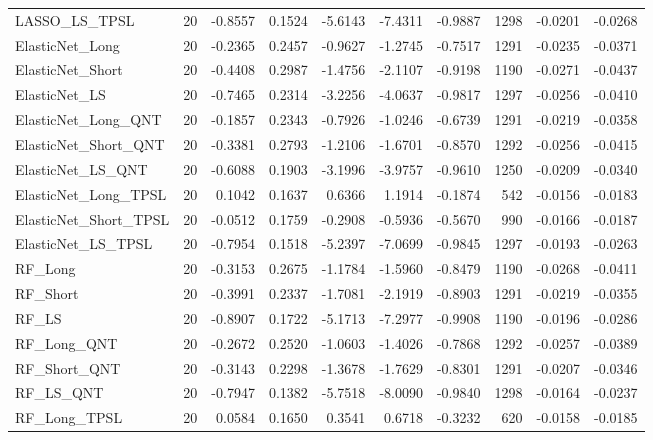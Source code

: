 \begin{tabular}{llrrrrrrrr}
\cline{1-10}
LASSO\_LS\_TPSL & 20 & -0.8557 & 0.1524 & -5.6143 & -7.4311 & -0.9887 & 1298 & -0.0201 & -0.0268 \\
\cline{1-10}
ElasticNet\_Long & 20 & -0.2365 & 0.2457 & -0.9627 & -1.2745 & -0.7517 & 1291 & -0.0235 & -0.0371 \\
\cline{1-10}
ElasticNet\_Short & 20 & -0.4408 & 0.2987 & -1.4756 & -2.1107 & -0.9198 & 1190 & -0.0271 & -0.0437 \\
\cline{1-10}
ElasticNet\_LS & 20 & -0.7465 & 0.2314 & -3.2256 & -4.0637 & -0.9817 & 1297 & -0.0256 & -0.0410 \\
\cline{1-10}
ElasticNet\_Long\_QNT & 20 & -0.1857 & 0.2343 & -0.7926 & -1.0246 & -0.6739 & 1291 & -0.0219 & -0.0358 \\
\cline{1-10}
ElasticNet\_Short\_QNT & 20 & -0.3381 & 0.2793 & -1.2106 & -1.6701 & -0.8570 & 1292 & -0.0256 & -0.0415 \\
\cline{1-10}
ElasticNet\_LS\_QNT & 20 & -0.6088 & 0.1903 & -3.1996 & -3.9757 & -0.9610 & 1250 & -0.0209 & -0.0340 \\
\cline{1-10}
ElasticNet\_Long\_TPSL & 20 & 0.1042 & 0.1637 & 0.6366 & 1.1914 & -0.1874 & 542 & -0.0156 & -0.0183 \\
\cline{1-10}
ElasticNet\_Short\_TPSL & 20 & -0.0512 & 0.1759 & -0.2908 & -0.5936 & -0.5670 & 990 & -0.0166 & -0.0187 \\
\cline{1-10}
ElasticNet\_LS\_TPSL & 20 & -0.7954 & 0.1518 & -5.2397 & -7.0699 & -0.9845 & 1297 & -0.0193 & -0.0263 \\
\cline{1-10}
RF\_Long & 20 & -0.3153 & 0.2675 & -1.1784 & -1.5960 & -0.8479 & 1190 & -0.0268 & -0.0411 \\
\cline{1-10}
RF\_Short & 20 & -0.3991 & 0.2337 & -1.7081 & -2.1919 & -0.8903 & 1291 & -0.0219 & -0.0355 \\
\cline{1-10}
RF\_LS & 20 & -0.8907 & 0.1722 & -5.1713 & -7.2977 & -0.9908 & 1190 & -0.0196 & -0.0286 \\
\cline{1-10}
RF\_Long\_QNT & 20 & -0.2672 & 0.2520 & -1.0603 & -1.4026 & -0.7868 & 1292 & -0.0257 & -0.0389 \\
\cline{1-10}
RF\_Short\_QNT & 20 & -0.3143 & 0.2298 & -1.3678 & -1.7629 & -0.8301 & 1291 & -0.0207 & -0.0346 \\
\cline{1-10}
RF\_LS\_QNT & 20 & -0.7947 & 0.1382 & -5.7518 & -8.0090 & -0.9840 & 1298 & -0.0164 & -0.0237 \\
\cline{1-10}
RF\_Long\_TPSL & 20 & 0.0584 & 0.1650 & 0.3541 & 0.6718 & -0.3232 & 620 & -0.0158 & -0.0185 \\

\end{tabular}
